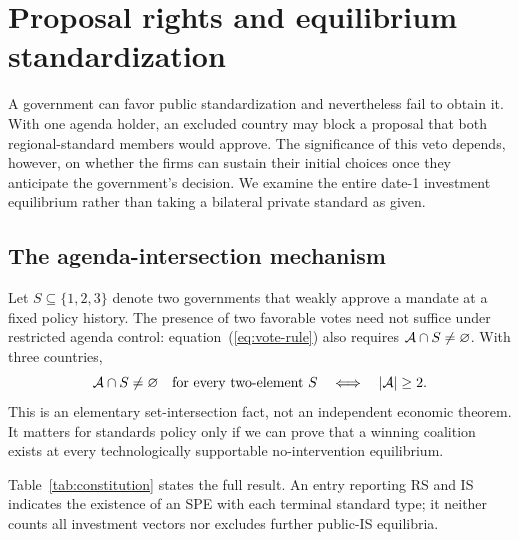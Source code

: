 \section{Proposal rights and equilibrium standardization}\label{sec:equilibria}

A government can favor public standardization and nevertheless fail to obtain it. With one agenda holder, an excluded country may block a proposal that both regional-standard members would approve. The significance of this veto depends, however, on whether the firms can sustain their initial choices once they anticipate the government's decision. We examine the entire date-1 investment equilibrium rather than taking a bilateral private standard as given.

\subsection{The agenda-intersection mechanism}\label{subsec:agenda-geometry}

Let \(S\subseteq\{1,2,3\}\) denote two governments that weakly approve a mandate at a fixed policy history. The presence of two favorable votes need not suffice under restricted agenda control: equation~(\ref{eq:vote-rule}) also requires \(\mathcal{A}\cap S\ne\varnothing\). With three countries,
\begin{equation}
 \mathcal{A}\cap S\ne\varnothing
 \quad\text{for every two-element }S
 \quad\Longleftrightarrow\quad|\mathcal{A}|\ge2.
 \label{eq:hitting}
\end{equation}
This is an elementary set-intersection fact, not an independent economic theorem. It matters for standards policy only if we can prove that a winning coalition exists at every technologically supportable no-intervention equilibrium.

Table~\ref{tab:constitution} states the full result. An entry reporting RS and IS indicates the existence of an SPE with each terminal standard type; it neither counts all investment vectors nor excludes further public-IS equilibria.

